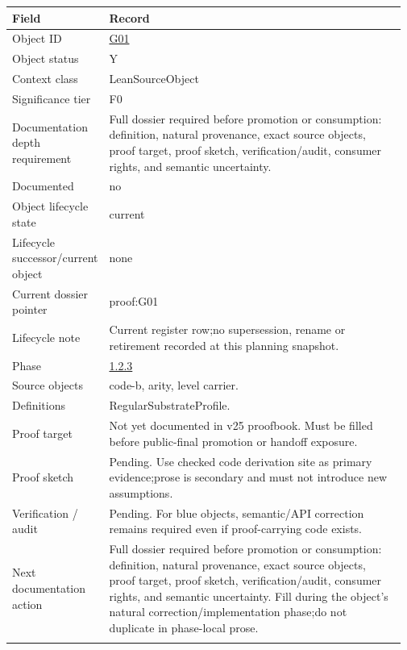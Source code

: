 \begin{longtable}{L{0.16\linewidth} L{0.81\linewidth}}
\hline
\textbf{Field} & \textbf{Record}\\
\hline
Object ID & \hyperlink{object-row-G01}{G01}\\
\hline\addlinespace[0.20em]
Object status & Y\\
\hline\addlinespace[0.20em]
Context class & LeanSourceObject\\
\hline\addlinespace[0.20em]
Significance tier & F0\\
\hline\addlinespace[0.20em]
Documentation depth requirement & Full dossier required before promotion or consumption: definition, natural provenance, exact source objects, proof target, proof sketch, verification/\allowbreak{}audit, consumer rights, and semantic uncertainty.\\
\hline\addlinespace[0.20em]
Documented & no\\
\hline\addlinespace[0.20em]
Object lifecycle state & current\\
\hline\addlinespace[0.20em]
Lifecycle successor/\allowbreak{}current object & none\\
\hline\addlinespace[0.20em]
Current dossier pointer & proof:G01\\
\hline\addlinespace[0.20em]
Lifecycle note & Current register row;\newline no supersession, rename or retirement recorded at this planning snapshot.\\
\hline\addlinespace[0.20em]
Phase & \hyperlink{phase-row-1-2-3}{1.2.3}\\
\hline\addlinespace[0.20em]
Source objects & code-b, arity, level carrier.\\
\hline\addlinespace[0.20em]
Definitions & RegularSubstrateProfile.\\
\hline\addlinespace[0.20em]
Proof target & Not yet documented in v25 proofbook. Must be filled before public-final promotion or handoff exposure.\\
\hline\addlinespace[0.20em]
Proof sketch & Pending. Use checked code derivation site as primary evidence;\newline prose is secondary and must not introduce new assumptions.\\
\hline\addlinespace[0.20em]
Verification /\allowbreak{} audit & Pending. For blue objects, semantic/\allowbreak{}API correction remains required even if proof-carrying code exists.\\
\hline\addlinespace[0.20em]
Next documentation action & Full dossier required before promotion or consumption: definition, natural provenance, exact source objects, proof target, proof sketch, verification/\allowbreak{}audit, consumer rights, and semantic uncertainty. Fill during the object's natural correction/\allowbreak{}implementation phase;\newline do not duplicate in phase-local prose.\\
\hline\addlinespace[0.20em]
\end{longtable}
